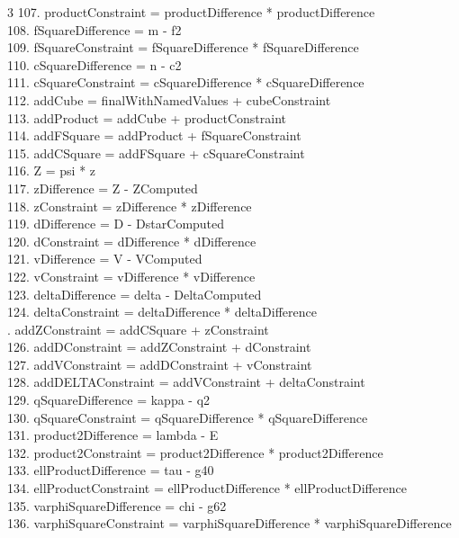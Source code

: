 \documentclass[10pt]{article}
\begin{document}
\begin{multicols}{3}
107. productConstraint = productDifference * productDifference\\
108. fSquareDifference = m - f2\\
109. fSquareConstraint = fSquareDifference * fSquareDifference\\
110. cSquareDifference = n - c2\\
111. cSquareConstraint = cSquareDifference * cSquareDifference\\
112. addCube = finalWithNamedValues + cubeConstraint\\
113. addProduct = addCube + productConstraint\\
114. addFSquare = addProduct + fSquareConstraint\\
115. addCSquare = addFSquare + cSquareConstraint\\
116. Z = psi * z\\
117. zDifference = Z - ZComputed\\
118. zConstraint = zDifference * zDifference\\
119. dDifference = D - DstarComputed\\
120. dConstraint = dDifference * dDifference\\
121. vDifference = V - VComputed\\
122. vConstraint = vDifference * vDifference\\
123. deltaDifference = delta - DeltaComputed\\
124. deltaConstraint = deltaDifference * deltaDifference\\
. addZConstraint = addCSquare + zConstraint\\
126. addDConstraint = addZConstraint + dConstraint\\
127. addVConstraint = addDConstraint + vConstraint\\
128. addDELTAConstraint = addVConstraint + deltaConstraint\\
129. qSquareDifference = kappa - q2\\
130. qSquareConstraint = qSquareDifference * qSquareDifference\\
131. product2Difference = lambda - E\\
132. product2Constraint = product2Difference * product2Difference\\
133. ellProductDifference = tau - g40\\
134. ellProductConstraint = ellProductDifference * ellProductDifference\\
135. varphiSquareDifference = chi - g62\\
136. varphiSquareConstraint = varphiSquareDifference * varphiSquareDifference\\

\end{multicols}
\end{document}

